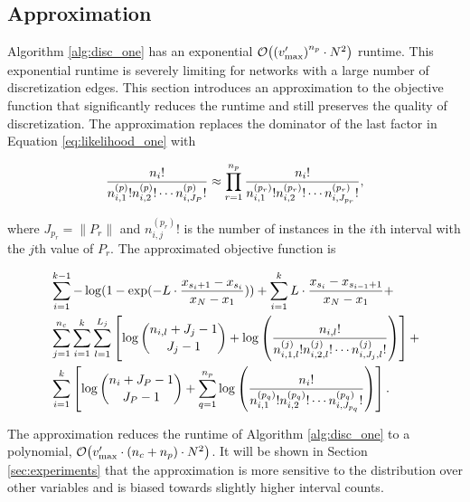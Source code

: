 \subsection{Approximation}

Algorithm \ref{alg:disc_one} has an exponential $\bigo\paren{\paren{v'_\text{max}}^{n_p} \cdot N^2}$ runtime.
This exponential runtime is severely limiting for networks with a large number of discretization edges.
This section introduces an approximation to the objective function that significantly reduces the runtime and still preserves the quality of discretization.
The approximation replaces the dominator of the last factor in Equation \ref{eq:likelihood_one} with

\begin{equation}
{\frac{{n_i}!}{ {n^{(p)}_{i,1} !} {n^{(p)}_{i,2} !} \cdots {n^{(p)}_{i,J_P} !}}} \approx \prod_{r=1}^{n_p} { {{{n}_i}!}\over{ {n^{(p_r)}_{i,1} !} {n^{(p_r)}_{i,2} !} \cdots {n^{(p_r)}_{i,J_{p_r}} !}}}\text{,}
\end{equation}

\noindent
where $J_{p_r} = \| P_r\|$ and ${n^{(p_r)}_{i,j} !}$ is the number of instances in the $i$th interval with the $j$th value of $P_r$.
The approximated objective function is

\begin{equation}
\begin{aligned}
\label{eq:opt_prob_approx}
& \sum_{i=1}^{k-1} - \log(1 - {\exp(- L \cdot {{x_{s_i+1} - x_{s_i}}\over{x_N - x_1}})}) +  \sum_{i=1}^{k} L \cdot {{x_{s_{i}} - x_{s_{i-1} + 1}}\over{x_N - x_1}} +\\
&  \sum_{j=1}^{n_c} \sum_{i=1}^{k}  \sum_{l=1}^{L_j} \left[  \log{{n_{i,l} + J_j - 1}\choose{J_j-1}} + \log \left( { {{n_{i,l}}!}\over{ {n^{(j)}_{i,1,l} !} {n^{(j)}_{i,2,l} !} \cdots {n^{(j)}_{i,J_j,l} !}} } \right) \right] + \\
& \sum_{i=1}^k \left[  \log {{n_{i} + J_P - 1}\choose{J_P-1}} + \sum_{q=1}^{n_p} \log \left( { {{{n}_i}!}\over{ {n^{(p_q)}_{i,1} !} {n^{(p_q)}_{i,2} !} \cdots {n^{(p_q)}_{i,J_{p_q}} !}}} \right) \right]\text{.}
\end{aligned}
\end{equation}

The approximation reduces the runtime of Algorithm \ref{alg:disc_one} to a polynomial, $\bigo\paren{ {v'_\text{max}} \cdot (n_c + n_p) \cdot N^2}$.
It will be shown in Section \ref{sec:experiments} that the approximation is more sensitive to the distribution over other variables and is biased towards slightly higher interval counts.

